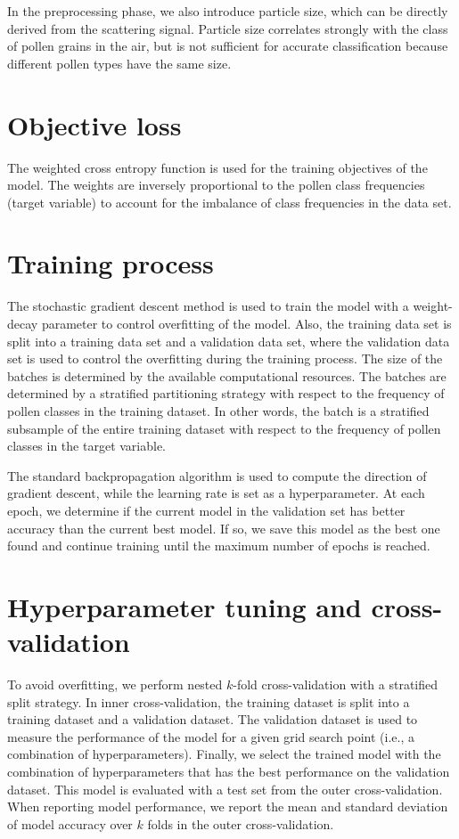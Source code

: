 \documentclass{article}
\begin{document}
In the preprocessing phase, we also introduce particle size, which can be directly derived from the scattering signal. Particle size correlates strongly with the class of pollen grains in the air, but is not sufficient for accurate classification because different pollen types have the same size.



\section{Objective loss}

The weighted cross entropy function is used for the training objectives of the model. The weights are inversely proportional to the pollen class frequencies (target variable) to account for the imbalance of class frequencies in the data set.

\section{Training process}

The stochastic gradient descent method is used to train the model with a weight-decay parameter to control overfitting of the model. Also, the training data set is split into a training data set and a validation data set, where the validation data set is used to control the overfitting during the training process. The size of the batches is determined by the available computational resources. The batches are determined by a stratified partitioning strategy with respect to the frequency of pollen classes in the training dataset. In other words, the batch is a stratified subsample of the entire training dataset with respect to the frequency of pollen classes in the target variable.

The standard backpropagation algorithm is used to compute the direction of gradient descent, while the learning rate is set as a hyperparameter.
At each epoch, we determine if the current model in the validation set has better accuracy than the current best model. If so, we save this model as the best one found and continue training until the maximum number of epochs is reached.

\section{Hyperparameter tuning and cross-validation}

To avoid overfitting, we perform nested $k$-fold cross-validation with a stratified split strategy. In inner cross-validation, the training dataset is split into a training dataset and a validation dataset. The validation dataset is used to measure the performance of the model for a given grid search point (i.e., a combination of hyperparameters). Finally, we select the trained model with the combination of hyperparameters that has the best performance on the validation dataset. This model is evaluated with a test set from the outer cross-validation.
When reporting model performance, we report the mean and standard deviation of model accuracy over $k$ folds in the outer cross-validation.
\end{document}
